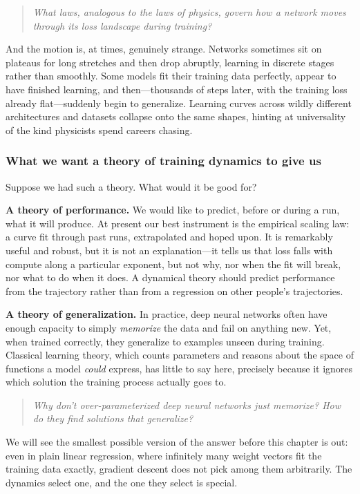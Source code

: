 \begin{quote}
\textit{What laws, analogous to the laws of physics, govern how a network moves through its loss landscape during training?}
\end{quote}

And the motion is, at times, genuinely strange. Networks sometimes sit on plateaus for long stretches and then drop abruptly, learning in discrete stages rather than smoothly. Some models fit their training data perfectly, appear to have finished learning, and then---thousands of steps later, with the training loss already flat---suddenly begin to generalize. Learning curves across wildly different architectures and datasets collapse onto the same shapes, hinting at universality of the kind physicists spend careers chasing. 

\subsubsection*{What we want a theory of training dynamics to give us}

Suppose we had such a theory. What would it be good for?

\textbf{A theory of performance.} We would like to predict, before or during a run, what it will produce. At present our best instrument is the empirical scaling law: a curve fit through past runs, extrapolated and hoped upon. It is remarkably useful and robust, but it is not an explanation---it tells us that loss falls with compute along a particular exponent, but not why, nor when the fit will break, nor what to do when it does. A dynamical theory should predict performance from the trajectory rather than from a regression on other people's trajectories.

\textbf{A theory of generalization.} In practice, deep neural networks often have enough capacity to simply \textit{memorize} the data and fail on anything new. Yet, when trained correctly, they generalize to examples unseen during training. Classical learning theory, which counts parameters and reasons about the space of functions a model \textit{could} express, has little to say here, precisely because it ignores which solution the training process actually goes to.

\begin{quote}
\textit{Why don't over-parameterized deep neural networks just memorize? How do they find solutions that generalize?}
\end{quote}

We will see the smallest possible version of the answer before this chapter is out: even in plain linear regression, where infinitely many weight vectors fit the training data exactly, gradient descent does not pick among them arbitrarily. The dynamics select one, and the one they select is special.

